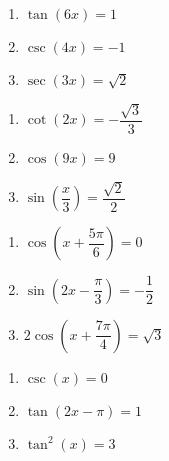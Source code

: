 \begin{multicols}{3}

\begin{enumerate}

\setcounter{enumi}{\value{HW}}

\item $\tan \left( 6x \right) = 1$
\item $\csc \left( 4x \right) = -1$
\item $\sec \left( 3x \right) = \sqrt{2}$

\setcounter{HW}{\value{enumi}}

\end{enumerate}

\end{multicols}

\begin{multicols}{3}

\begin{enumerate}

\setcounter{enumi}{\value{HW}}

\item $\cot \left( 2x \right) = -\dfrac{\sqrt{3}}{3}$
\item $\cos \left( 9x \right) = 9$ 
\item $\sin \left( \dfrac{x}{3} \right) = \dfrac{\sqrt{2}}{2}$

\setcounter{HW}{\value{enumi}}

\end{enumerate}

\end{multicols}

\begin{multicols}{3}

\begin{enumerate}

\setcounter{enumi}{\value{HW}}

\item $\cos \left( x + \dfrac{5\pi}{6} \right) = 0$
\item $\sin \left( 2x - \dfrac{\pi}{3} \right) = -\dfrac{1}{2}$
\item $2\cos \left( x + \dfrac{7\pi}{4} \right) = \sqrt{3}$

\setcounter{HW}{\value{enumi}}

\end{enumerate}

\end{multicols}

\begin{multicols}{3}

\begin{enumerate}

\setcounter{enumi}{\value{HW}}

\item $\csc(x) = 0$
\item $\tan \left( 2x - \pi \right) = 1$
\item $\tan^{2} \left( x \right) = 3$

\setcounter{HW}{\value{enumi}}

\end{enumerate}

\end{multicols}


